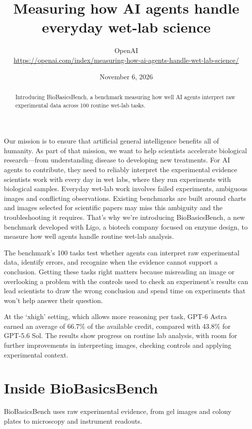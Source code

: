 \documentclass{article}
\title{Measuring how AI agents handle everyday wet-lab science}
\author{
  OpenAI \\[6pt]
  \normalfont\footnotesize\url{https://openai.com/index/measuring-how-ai-agents-handle-wet-lab-science/}
}
\date{November 6, 2026}
\begin{document}
\maketitle

\begin{abstract}
\noindent Introducing BioBasicsBench, a benchmark measuring how well AI agents interpret raw experimental data across 100 routine wet-lab tasks.
\end{abstract}

\vspace{6pt}

Our mission is to ensure that artificial general intelligence benefits all of humanity. As part of that mission, we want to help scientists accelerate biological research---from understanding disease to developing new treatments. For AI agents to contribute, they need to reliably interpret the experimental evidence scientists work with every day in wet labs, where they run experiments with biological samples. Everyday wet-lab work involves failed experiments, ambiguous images and conflicting observations. Existing benchmarks are built around charts and images selected for scientific papers may miss this ambiguity and the troubleshooting it requires. That's why we're introducing BioBasicsBench, a new benchmark developed with Ligo, a biotech company focused on enzyme design, to measure how well agents handle routine wet-lab analysis.

The benchmark's 100 tasks test whether agents can interpret raw experimental data, identify errors, and recognize when the evidence cannot support a conclusion. Getting these tasks right matters because misreading an image or overlooking a problem with the controls used to check an experiment's results can lead scientists to draw the wrong conclusion and spend time on experiments that won't help answer their question.

At the `xhigh' setting, which allows more reasoning per task, GPT-6 Astra earned an average of 66.7\% of the available credit, compared with 43.8\% for GPT-5.6 Sol. The results show progress on routine lab analysis, with room for further improvements in interpreting images, checking controls and applying experimental context.

\section{Inside BioBasicsBench}

BioBasicsBench uses raw experimental evidence, from gel images and colony plates to microscopy and instrument readouts.
\end{document}
